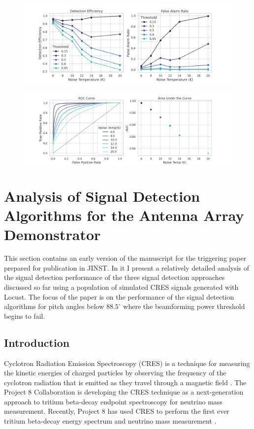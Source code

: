 \begin{figure}[htbp]
    \centering
    \includegraphics*[width=1.0\textwidth]{figs/Chapter-4/210625_plot_dfcnn_efficiency_vs_noise_temp.png}
    \caption{}
\end{figure}

\begin{figure}[htbp]
    \centering
    \includegraphics*[width=1.0\textwidth]{figs/Chapter-4/210625_plot_dfcnn_roc_vs_noise_temp.png}
    \caption{}
\end{figure}



\section{Analysis of Signal Detection Algorithms for the Antenna Array Demonstrator}
\label{sec:chap4-trigger-paper}
This section contains an early version of the manuscript for the triggering paper prepared for publication in JINST. In it I present a relatively detailed analysis of the signal detection performance of the three signal detection approaches discussed so far using a population of simulated CRES signals generated with Locust. The focus of the paper is on the performance of the signal detection algorithms for pitch angles below $88.5^\circ$ where the beamforming power threshold begins to fail.

\subsection{Introduction}
Cyclotron Radiation Emission Spectroscopy (CRES) is a technique for measuring the kinetic energies of charged particles by observing the frequency of the cyclotron radiation that is emitted as they travel through a magnetic field \cite{p8originalcres}.
The Project 8 Collaboration is developing the CRES technique as a next-generation approach to tritium beta-decay endpoint spectroscopy for neutrino mass measurement. Recently, Project 8 has used CRES to perform the first ever tritium beta-decay energy spectrum and neutrino mass measurement \cite{p8prl2023, p8prc2023}.

